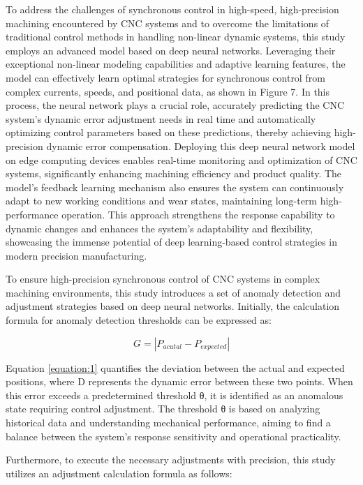 \documentclass[preprint,12pt,authoryear]{elsarticle}
\begin{document}
To address the challenges of synchronous control in high-speed, high-precision machining encountered by CNC systems and to overcome the limitations of traditional control methods in handling non-linear dynamic systems, this study employs an advanced model based on deep neural networks. Leveraging their exceptional non-linear modeling capabilities and adaptive learning features, the model can effectively learn optimal strategies for synchronous control from complex currents, speeds, and positional data, as shown in Figure 7. In this process, the neural network plays a crucial role, accurately predicting the CNC system's dynamic error adjustment needs in real time and automatically optimizing control parameters based on these predictions, thereby achieving high-precision dynamic error compensation. Deploying this deep neural network model on edge computing devices enables real-time monitoring and optimization of CNC systems, significantly enhancing machining efficiency and product quality. The model's feedback learning mechanism also ensures the system can continuously adapt to new working conditions and wear states, maintaining long-term high-performance operation. This approach strengthens the response capability to dynamic changes and enhances the system's adaptability and flexibility, showcasing the immense potential of deep learning-based control strategies in modern precision manufacturing.

To ensure high-precision synchronous control of CNC systems in complex machining environments, this study introduces a set of anomaly detection and adjustment strategies based on deep neural networks. Initially, the calculation formula for anomaly detection thresholds can be expressed as:

\begin{equation}
    G=|P_{acutal}-P_{expected}|
    \label{equation:1}
\end{equation}

Equation \ref{equation:1} quantifies the deviation between the actual and expected positions, where D represents the dynamic error between these two points. When this error exceeds a predetermined threshold θ, it is identified as an anomalous state requiring control adjustment. The threshold θ is based on analyzing historical data and understanding mechanical performance, aiming to find a balance between the system's response sensitivity and operational practicality.

Furthermore, to execute the necessary adjustments with precision, this study utilizes an adjustment calculation formula as follows:
\end{document}

